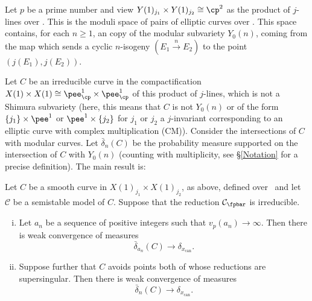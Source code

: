 \documentclass[12pt,letterpaper]{article}
\begin{document}
	
	
	
	
	
	
	Let $p$ be a prime number and view $Y(1)_{j_1}\times Y(1)_{j_2}\cong \cp^2$ as the product of $j$-lines over \cp. This is the moduli space of pairs of elliptic curves over \cp. This space contains, for each $n\geq1$, an copy of the modular subvariety $Y_0(n)$, coming from the map which sends a cyclic $n$-isogeny $(E_1\xrightarrow{n}E_2)$ to the point $(j(E_1),j(E_2))$. 
	
	Let $C$ be an irreducible curve in the compactification $X(1)\times X(1)\cong \pee^1_{\cp}\times\pee^1_{\cp}$ of this product of $j$-lines, which is not a Shimura subvariety (here, this means that $C$ is not $Y_0(n)$ or of the form $\{j_1\}\times \pee^1$ or $\pee^1\times \{j_2\}$ for $j_1$ or $j_2$ a $j$-invariant corresponding to an elliptic curve with complex multiplication (CM)). Consider the intersections of $C$ with modular curves. Let $\bar{\delta}_n(C)$ be the probability measure supported on the intersection of $C$ with $Y_0(n)$ (counting with multiplicity, see \S\ref{Notation} for a precise definition). The main result is: 
	
	\begin{thm} \label{Main}
		Let $C$ be a smooth curve in $X(1)_{j_1}\times X(1)_{j_2}$, as above, defined over \cp \ and let $\mathcal{C}$ be a semistable model of $C$. Suppose that the reduction $\mathcal{C}_{\fpbar}$ is irreducible.
		\begin{enumerate}[(i)]
			\item Let $a_n$ be a sequence of positive integers such that $v_p(a_n)\to \infty$. Then there is weak convergence of measures \[\bar{\delta}_{a_n}(C)\to \delta_{x_\text{can}}.\]
			\item Suppose further that $C$ avoids points both of whose reductions are supersingular. Then there is weak convergence of measures
			\[\bar{\delta}_{n}(C)\to \delta_{x_\text{can}}.\]
		\end{enumerate}
	\end{thm}
	
\end{document}
